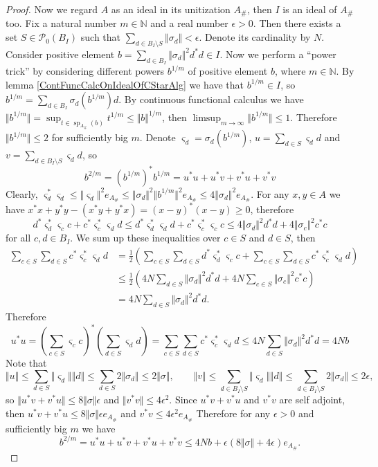 \begin{proof}
Now we regard $A$ as an ideal in its unitization $A_\#$, then $I$ is an ideal of $A_\#$ too. Fix a natural number $m\in\mathbb{N}$ and a real number $\epsilon>0$. Then there exists a set $S\in\mathcal{P}_0(B_I)$ such that $\sum_{d\in B_I\setminus S}\Vert\sigma_d\Vert<\epsilon$. Denote its cardinality by $N$. Consider positive element $b=\sum_{d\in B_I}\Vert\sigma_d\Vert^2 d^*d\in I$. Now we perform a ``power trick'' by considering different powers $b^{1/m}$ of positive element $b$, where $m\in\mathbb{N}$. By lemma \ref{ContFuncCalcOnIdealOfCStarAlg} we have that $b^{1/m}\in I$, so $b^{1/m}=\sum_{d\in B_I}\sigma_d(b^{1/m})d$. By continuous functional calculus we have $\Vert b^{1/m}\Vert=\sup_{t\in\operatorname{sp}_{A_\#}(b)} t^{1/m}\leq\Vert b\Vert^{1/m}$, then $\limsup_{m\to\infty}\Vert b^{1/m}\Vert\leq 1$. Therefore $\Vert b^{1/m}\Vert\leq 2$ for sufficiently big $m$. Denote $\varsigma_d=\sigma_d(b^{1/m})$, $u=\sum_{d\in S}\varsigma_dd$ and $v=\sum_{d\in B_I\setminus S}\varsigma_d d$, so 
$$
b^{2/m}=(b^{1/m})^*b^{1/m}=u^*u+u^*v+v^*u+v^*v
$$
Clearly, $\varsigma_d^*\varsigma_d\leq \Vert \varsigma_d\Vert^2 e_{A_\#}\leq \Vert \sigma_d\Vert^2\Vert b^{1/m}\Vert^2 e_{A_\#}\leq 4\Vert \sigma_d\Vert^2 e_{A_\#}$. For any $x,y\in A$ we have $x^*x+y^*y-(x^*y+y^*x)=(x-y)^*(x-y)\geq 0$, therefore 
$$
d^*\varsigma_d^* \varsigma_c c+c^*\varsigma_c^* \varsigma_d d
\leq d^*\varsigma_d^*\varsigma_d d + c^*\varsigma_c^*\varsigma_c c
\leq 4\Vert \sigma_d\Vert^2 d^*d+4\Vert \sigma_c\Vert^2 c^*c
$$
for all $c,d\in B_I$. We sum up these inequalities over $c\in S$ and $d\in S$, then 
$$
\begin{aligned}
\sum_{c\in S}\sum_{d\in S}c^*\varsigma_c^* \varsigma_d d
&=\frac{1}{2}\left(\sum_{c\in S}\sum_{d\in S}d^*\varsigma_d^* \varsigma_c c+\sum_{c\in S}\sum_{d\in S}c^*\varsigma_c^* \varsigma_d d\right)\\
&\leq\frac{1}{2}\left(4 N\sum_{d\in S} \Vert \sigma_d\Vert^2 d^*d+
4 N\sum_{c\in S} \Vert \sigma_c\Vert^2 c^*c\right)\\
&=4 N\sum_{d\in S} \Vert \sigma_d\Vert^2 d^*d.
\end{aligned}
$$
Therefore
$$
u^*u
=\left(\sum_{c\in S}\varsigma_c c\right)^*\left(\sum_{d\in S}\varsigma_d d\right)
=\sum_{c\in S}\sum_{d\in S}c^*\varsigma_c^* \varsigma_d d
\leq 4N\sum_{d\in S} \Vert \sigma_d\Vert^2 d^*d
= 4N b
$$
Note that
$$
\Vert u\Vert
\leq \sum_{d\in S}\Vert\varsigma_d\Vert\Vert d\Vert
\leq \sum_{d\in S}2\Vert\sigma_d\Vert
\leq 2\Vert\sigma\Vert,
\qquad
\Vert v\Vert
\leq \sum_{d\in B_I\setminus S}\Vert\varsigma_d\Vert\Vert d\Vert
\leq \sum_{d\in B_I\setminus S}2\Vert\sigma_d\Vert
\leq 2\epsilon,
$$
so $\Vert u^*v+v^*u\Vert\leq 8\Vert\sigma\Vert\epsilon$ and $\Vert v^*v\Vert\leq 4\epsilon^2$. Since $u^*v+v^*u$ and $v^*v$ are self adjoint, then $u^*v+v^*u\leq 8\Vert\sigma\Vert\epsilon e_{A_\#}$ and $v^*v\leq 4\epsilon^2 e_{A_\#}$
Therefore for any $\epsilon>0$ and sufficiently big $m$ we have 
$$
b^{2/m}
=u^*u+u^*v+v^*u+v^*v
\leq 4Nb+\epsilon(8\Vert\sigma\Vert+4\epsilon)e_{A_\#}.
$$



\end{proof}
